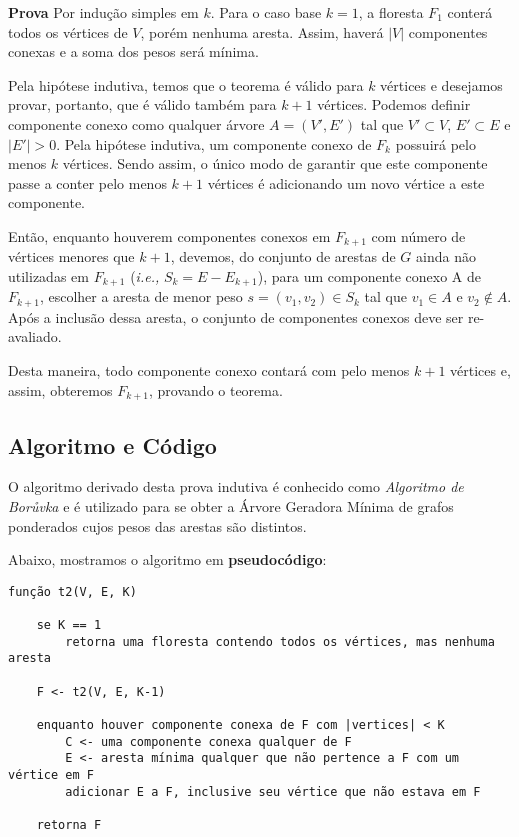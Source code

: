 \documentclass[a4paper]{article}
\begin{document}
\medskip
\noindent
\textbf{Prova} \:
Por indução simples em $k$. Para o caso base $k = 1$, a floresta $F_1$ conterá todos os vértices de $V$, porém nenhuma aresta. Assim, haverá $|V|$ componentes conexas e a soma dos pesos será mínima.

Pela hipótese indutiva, temos que o teorema é válido para $k$ vértices e desejamos provar, portanto, que é válido também para $k+1$ vértices. Podemos definir componente conexo como qualquer árvore $A=(V',E')$ tal que $V'\subset V$, $E'\subset E$ e $|E'|>0$. Pela hipótese indutiva, um componente conexo de $F_k$ possuirá pelo menos $k$ vértices.
Sendo assim, o único modo de garantir que este componente passe a conter pelo menos $k+1$ vértices é adicionando um novo vértice a este componente.

Então, enquanto houverem componentes conexos em $F_{k+1}$ com número de vértices menores que $k+1$, devemos, do conjunto de arestas de $G$ ainda não utilizadas em $F_{k+1}$ (\textit{i.e.,} $S_k=E-E_{k+1}$), para um componente conexo A de $F_{k+1}$, escolher a aresta de menor peso $s=(v_1,v_2)\in S_k$ tal que $v_1 \in A$ e $v_2 \notin A$. Após a inclusão dessa aresta, o conjunto de componentes conexos deve ser re-avaliado.

Desta maneira, todo componente conexo contará com pelo menos $k+1$ vértices e, assim, obteremos $F_{k+1}$, provando o teorema.


\subsection*{Algoritmo e Código}

O algoritmo derivado desta prova indutiva é conhecido como \textit{Algoritmo de Borůvka} e é utilizado para se obter a Árvore Geradora Mínima de grafos ponderados cujos pesos das arestas são distintos.

Abaixo, mostramos o algoritmo em \textbf{pseudocódigo}:

{\color{ogreen}
\begin{verbatim}
função t2(V, E, K)

    se K == 1
        retorna uma floresta contendo todos os vértices, mas nenhuma aresta

    F <- t2(V, E, K-1)

    enquanto houver componente conexa de F com |vertices| < K
        C <- uma componente conexa qualquer de F
        E <- aresta mínima qualquer que não pertence a F com um vértice em F
        adicionar E a F, inclusive seu vértice que não estava em F

    retorna F
\end{verbatim}
}
\end{document}
